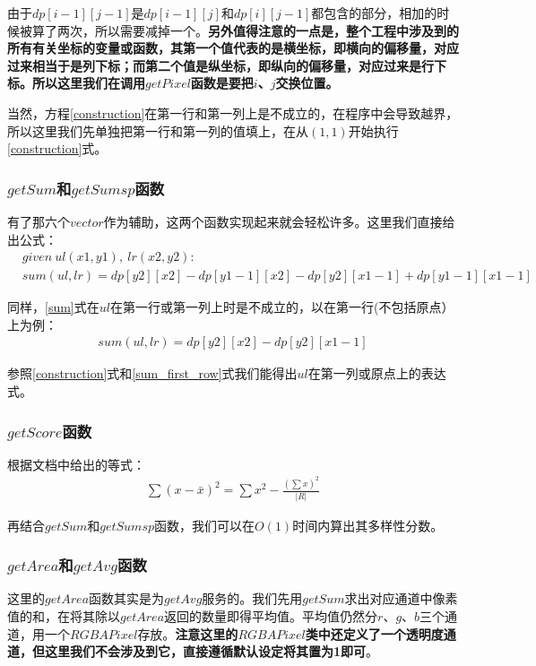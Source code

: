 \documentclass[UTF8]{ctexart}
\begin{document}
			\indent 由于$dp[i-1][j-1]$是$dp[i-1][j]$和$dp[i][j-1]$都包含的部分，相加的时候被算了两次，所以需要减掉一个。\textbf{另外值得注意的一点是，整个工程中涉及到的所有有关坐标的变量或函数，其第一个值代表的是横坐标，即横向的偏移量，对应过来相当于是列下标；而第二个值是纵坐标，即纵向的偏移量，对应过来是行下标。所以这里我们在调用$getPixel$函数是要把$i$、$j$交换位置。}
			
			\indent 当然，方程\ref{construction}在第一行和第一列上是不成立的，在程序中会导致越界，所以这里我们先单独把第一行和第一列的值填上，在从$(1, 1)$开始执行\ref{construction}式。
				
			\subsubsection{$getSum$和$getSumsp$函数}
			\indent 有了那六个$vector$作为辅助，这两个函数实现起来就会轻松许多。这里我们直接给出公式：	
			\begin{align}
			&given\ ul(x1, y1),\ lr(x2, y2): \\			
			&sum(ul, lr) = dp[y2][x2] - dp[y1-1][x2] - dp[y2][x1-1] + dp[y1-1][x1-1] \label{sum}
			\end{align}
		    
		    \indent 同样，\ref{sum}式在$ul$在第一行或第一列上时是不成立的，以在第一行(不包括原点）上为例：
		    \begin{align}
		    sum(ul, lr) = dp[y2][x2] - dp[y2][x1-1] \label{sum_first_row}
		    \end{align}

            参照\ref{construction}式和\ref{sum_first_row}式我们能得出$ul$在第一列或原点上的表达式。
            
            \subsubsection{$getScore$函数}
            \indent 根据文档中给出的等式：
            \begin{align}
            \sum(x - \bar{x})^{2} = \sum x^2 - \frac{(\sum x)^2}{|R|} \label{score}
            \end{align} 
            
            \indent 再结合$getSum$和$getSumsp$函数，我们可以在$O(1)$时间内算出其多样性分数。
            \subsubsection{$getArea$和$getAvg$函数}  
            \indent 这里的$getArea$函数其实是为$getAvg$服务的。我们先用$getSum$求出对应通道中像素值的和，在将其除以$getArea$返回的数量即得平均值。平均值仍然分$r$、$g$、$b$三个通道，用一个$RGBAPixel$存放。\textbf{注意这里的$RGBAPixel$类中还定义了一个透明度通道，但这里我们不会涉及到它，直接遵循默认设定将其置为1即可}。      		    
\end{document}
